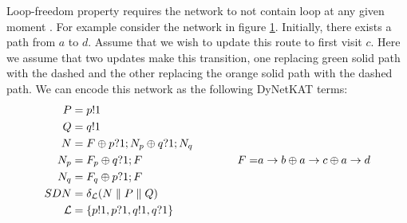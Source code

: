 \begin{example}
    \begin{figure}
        \centering
        \caption{ }
        \label{fig:loop}
    \end{figure}
    Loop-freedom property requires the network to not contain loop
    at any given moment \cite{network-abstractions}.
    For example consider the network in figure \ref{fig:loop}.
    Initially, there exists a path from $a$ to $d$.
    Assume that we wish to update this route to first visit $c$.
    Here we assume that two updates make this transition, one
    replacing green solid path with the dashed and the other
    replacing the orange solid path with the dashed path.
    We can encode this network as the following DyNetKAT terms:
    \begin{equation*}
        \begin{aligned}
            P           & = p!1                                             \\
            Q           & = q!1                                             \\
            N           & = F \oplus p?1;N_p \oplus q?1;N_q                 \\
            N_p         & = F_p \oplus q?1;F                                \\
            N_q         & = F_q \oplus p?1;F                                \\
            SDN         & = \delta_{\mathcal{L}}(N \parallel P \parallel Q) \\
            \mathcal{L} & = \s{p!1,p?1,q!1,q?1}
        \end{aligned}
        \qquad \qquad
        \begin{aligned}
            F    = & a\ra b \oplus a\ra c \oplus a\ra d               \\

\end{aligned}
\end{equation*}
\end{example}
